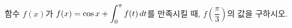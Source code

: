 \hspace*{2mm}\begin{minipage}[t]{\dimexpr\linewidth-2mm\relax}\vspace{0pt}
함수 $f(x)$가 $f(x)=\cos x+\displaystyle\int_{0}^{\pi}f(t)\mkern3mu dt$를 만족시킬 때, $f\!\left(\dfrac{\pi}{3}\right)$의 값을 구하시오.\end{minipage}
